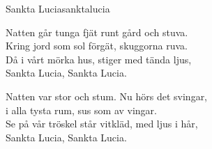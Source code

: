 \begin{song}{Sankta Lucia}{sanktalucia}
\begin{vers}
Natten går tunga fjät runt gård och stuva.\\
Kring jord som sol förgät, skuggorna ruva.\\
Då i vårt mörka hus, stiger med tända ljus,\\
Sankta Lucia, Sankta Lucia.\\
\end{vers}
\begin{vers}
Natten var stor och stum. Nu hörs det svingar,\\
i alla tysta rum, sus som av vingar.\\
Se på vår tröskel står vitkläd, med ljus i hår,\\
Sankta Lucia, Sankta Lucia.\\
\end{vers}
\end{song}
